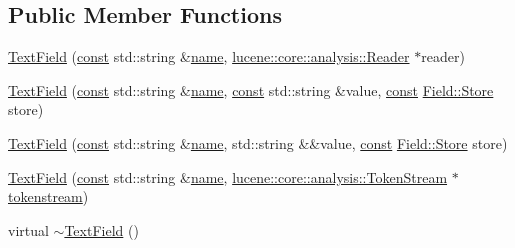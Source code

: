 \subsection*{Public Member Functions}
\begin{DoxyCompactItemize}
\item 
\mbox{\hyperlink{classlucene_1_1core_1_1document_1_1TextField_a2b7a587298cd4f15df081de5ef1c868a}{Text\+Field}} (\mbox{\hyperlink{ZlibCrc32_8h_a2c212835823e3c54a8ab6d95c652660e}{const}} std\+::string \&\mbox{\hyperlink{classlucene_1_1core_1_1document_1_1Field_a52f673f3b3abb14b180f5159f4726537}{name}}, \mbox{\hyperlink{classlucene_1_1core_1_1analysis_1_1Reader}{lucene\+::core\+::analysis\+::\+Reader}} $\ast$reader)
\item 
\mbox{\hyperlink{classlucene_1_1core_1_1document_1_1TextField_a240a22520ea651981c9ee78d5e3bc5d8}{Text\+Field}} (\mbox{\hyperlink{ZlibCrc32_8h_a2c212835823e3c54a8ab6d95c652660e}{const}} std\+::string \&\mbox{\hyperlink{classlucene_1_1core_1_1document_1_1Field_a52f673f3b3abb14b180f5159f4726537}{name}}, \mbox{\hyperlink{ZlibCrc32_8h_a2c212835823e3c54a8ab6d95c652660e}{const}} std\+::string \&value, \mbox{\hyperlink{ZlibCrc32_8h_a2c212835823e3c54a8ab6d95c652660e}{const}} \mbox{\hyperlink{classlucene_1_1core_1_1document_1_1Field_a7d5d79f0c56d3548ab8d46d0e7dae35d}{Field\+::\+Store}} store)
\item 
\mbox{\hyperlink{classlucene_1_1core_1_1document_1_1TextField_a7cf6397f05d45eda68c7ff78518e0cac}{Text\+Field}} (\mbox{\hyperlink{ZlibCrc32_8h_a2c212835823e3c54a8ab6d95c652660e}{const}} std\+::string \&\mbox{\hyperlink{classlucene_1_1core_1_1document_1_1Field_a52f673f3b3abb14b180f5159f4726537}{name}}, std\+::string \&\&value, \mbox{\hyperlink{ZlibCrc32_8h_a2c212835823e3c54a8ab6d95c652660e}{const}} \mbox{\hyperlink{classlucene_1_1core_1_1document_1_1Field_a7d5d79f0c56d3548ab8d46d0e7dae35d}{Field\+::\+Store}} store)
\item 
\mbox{\hyperlink{classlucene_1_1core_1_1document_1_1TextField_a326a52b309ab1d5aa778b48f4c63166d}{Text\+Field}} (\mbox{\hyperlink{ZlibCrc32_8h_a2c212835823e3c54a8ab6d95c652660e}{const}} std\+::string \&\mbox{\hyperlink{classlucene_1_1core_1_1document_1_1Field_a52f673f3b3abb14b180f5159f4726537}{name}}, \mbox{\hyperlink{classlucene_1_1core_1_1analysis_1_1TokenStream}{lucene\+::core\+::analysis\+::\+Token\+Stream}} $\ast$\mbox{\hyperlink{classlucene_1_1core_1_1document_1_1Field_a9ae72843cbdd8524362f65ee9f2c7355}{tokenstream}})
\item 
virtual \mbox{\hyperlink{classlucene_1_1core_1_1document_1_1TextField_afff9acea77a706d6b92c1c5dd2f057ce}{$\sim$\+Text\+Field}} ()
\end{DoxyCompactItemize}

